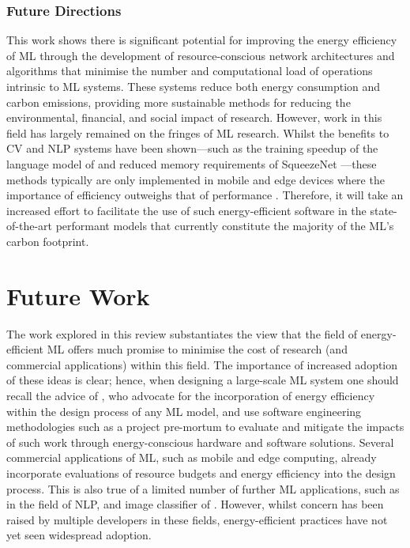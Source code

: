 \documentclass[a4paper, 12pt]{article}
\begin{document}
    \subsubsection{Future Directions}

    This work shows there is significant potential for improving the energy efficiency of ML through the development of resource-conscious network architectures and algorithms that minimise the number and computational load of operations intrinsic to ML systems. These systems reduce both energy consumption and carbon emissions, providing more sustainable methods for reducing the environmental, financial, and social impact of research. However, work in this field has largely remained on the fringes of ML research. Whilst the benefits to CV and NLP systems have been shown---such as the training speedup of the language model of  and reduced memory requirements of SqueezeNet \cite{iandola-2016}---these methods typically are only implemented in mobile and edge devices where the importance of efficiency outweighs that of performance \cite{kumar-2020}. Therefore, it will take an increased effort to facilitate the use of such energy-efficient software in the state-of-the-art performant models that currently constitute the majority of the ML's carbon footprint.


    \section{Future Work}

    The work explored in this review substantiates the view that the field of energy-efficient ML offers much promise to minimise the cost of research (and commercial applications) within this field. The importance of increased adoption of these ideas is clear; hence, when designing a large-scale ML system one should recall the advice of , who advocate for the incorporation of energy efficiency within the design process of any ML model, and use software engineering methodologies such as a project pre-mortum \cite{klein-2008} to evaluate and mitigate the impacts of such work through energy-conscious hardware and software solutions. Several commercial applications of ML, such as mobile and edge computing, already incorporate evaluations of resource budgets and energy efficiency into the design process. This is also true of a limited number of further ML applications, such as  in the field of NLP, and image classifier of . However, whilst concern has been raised by multiple developers in these fields, energy-efficient practices have not yet seen widespread adoption.
\end{document}
